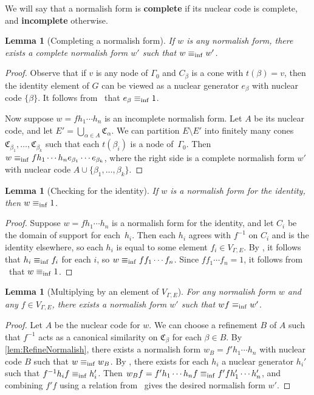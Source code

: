 \documentclass[11pt,letterpaper]{amsart}
\newtheorem{lemma}[theorem]{Lemma}
\theoremstyle{definition}
\newcommand{\newword}[1]{\textbf{#1}}
\newcommand{\C}{\mathfrak{C}}
\begin{document}
We will say that a normalish form is \newword{complete} if its nuclear code is complete, and \newword{incomplete} otherwise.

\begin{lemma}[Completing a normalish form]\label{lem:CompletingNormalish}
If $w$ is any normalish form, there exists a complete normalish form $w'$ such that $w\equiv_{\mathrm{inf}} w'$.
\end{lemma}

\begin{proof}
Observe that if $v$ is any node of $\Gamma_0$ and $C_\beta$ is a cone with $t(\beta)=v$, then the identity element of $G$ can be viewed as a nuclear generator $e_\beta$ with nuclear code $\{\beta\}$.  It follows from \VNuc\ that $e_\beta\equiv_{\mathrm{inf}} 1$.

Now suppose $w=fh_1\cdots h_n$ is an incomplete normalish form. Let $A$ be its nuclear code, and let $E'=\bigcup_{\alpha\in A} \C_{\alpha}$.  We can partition $E\setminus E'$ into finitely many cones $\C_{\beta_1},\ldots,\C_{\beta_k}$ such that each $t(\beta_i)$ is a node of~$\Gamma_0$.  Then $w\equiv_{\mathrm{inf}} fh_1\cdots h_n e_{\beta_1}\cdots e_{\beta_k}$, where the right side is a complete normalish form $w'$ with nuclear code $A\cup\{\beta_1,\ldots,\beta_k\}$.
\end{proof}

\begin{lemma}[Checking for the identity]\label{lem:TrivialNormalish}
If $w$ is a normalish form for the identity, then $w\equiv_{\mathrm{inf}} 1$.
\end{lemma}

\begin{proof}
Suppose $w=fh_1\cdots h_n$ is a normalish form for the identity, and let $C_i$ be the domain of support for each~$h_i$.  Then each $h_i$ agrees with $f^{-1}$ on $C_i$ and is the identity elsewhere, so each $h_i$ is equal to some element  $f_i\in V_{\Gamma,E}$.  By \VNuc, it follows that $h_i\equiv_{\mathrm{inf}} f_i$ for each $i$, so $w\equiv_{\mathrm{inf}} ff_1\cdots f_n$. Since $ff_1\cdots f_n=1$, it follows from \VRel\ that $w\equiv_{\mathrm{inf}} 1$.
\end{proof}

\begin{lemma}[Multiplying by an element of $V_{\Gamma,E}$]\label{lem:MultiplyByf}
For any normalish form $w$ and any $f\in V_{\Gamma,E}$, there exists a normalish form $w'$ such that $wf\equiv_{\mathrm{inf}} w'$.
\end{lemma}

\begin{proof}
Let $A$ be the nuclear code for $w$. We can choose a refinement $B$ of $A$ such that $f^{-1}$ acts as a canonical similarity on $\C_\beta$ for each $\beta\in B$.  By \cref{lem:RefineNormalish}, there exists a normalish form $w_B=f'h_1\cdots h_n$ with nuclear code $B$ such that $w\equiv_{\mathrm{inf}} w_B$.  By \Conj, there exists for each $h_i$ a nuclear generator $h_i'$ such that $f^{-1}h_if\equiv_{\mathrm{inf}} h_i'$.  Then $w_Bf = f'h_1\cdots h_nf\equiv_{\mathrm{inf}} f'fh_1'\cdots h_n'$, and combining $f'f$ using a relation from \VRel\ gives the desired normalish form $w'$.
\end{proof}
\end{document}

